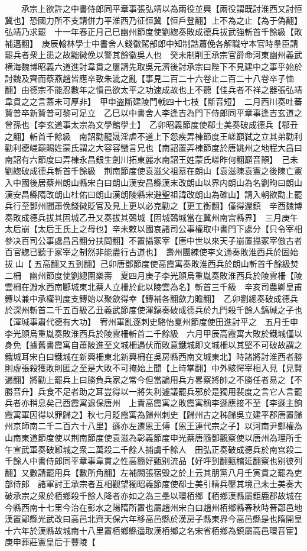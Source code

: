 　　承宗上欲許之中書侍郎同平章事張弘靖以為兩役並興【兩役謂既討淮西又討恒冀也】恐國力所不支請併力平淮西乃征恒冀【恒戶登翻】上不為之止【為于偽翻】弘靖乃求罷　十一年春正月己巳幽州節度使劉緫奏敗成德兵拔武強斬首千餘級【敗補邁翻】　庚辰翰林學士中書舍人錢徽駕部郎中知制誥蕭俛各解職守本官時羣臣請罷兵者衆上患之故黜徽俛以警其餘徽吳人也　癸未制削王承宗官爵命河東幽州義武横海魏博昭義六道進討韋貫之屢請先取吳元濟後討承宗曰陛下不見建中之事乎始於討魏及齊而蔡燕趙皆應卒致朱泚之亂【事見二百二十六卷止二百二十八卷卒子恤翻】由德宗不能忍數年之憤邑欲太平之功速成故也上不聽【佳兵者不祥之器張弘靖韋貫之之言蓋未可厚非】　甲申盗斷建陵門戟四十七枝【斷音短】　二月西川奏吐蕃贊普卒新贊普可黎可足立　乙巳以中書舍人李逢吉為門下侍郎同平章事逢吉玄道之曾孫也【李玄道事太宗為文學館學士】　乙卯昭義節度使郗士美奏破成德兵【郗丑之翻】斬首千餘級　南詔勸龍晟淫虐不道上下怨疾弄棟節度王嵯巔弑之立其弟勸利勸利德嵯巔賜姓蒙氏謂之大容容蠻言兄也【南詔置弄棟節度於唐姚州之地程大昌曰南詔有六節度曰弄棟永昌銀生劍川拓東麗水南詔王姓蒙氏嵯昨何翻巔音顛】　己未劉緫破成德兵斬首千餘級　荆南節度使袁滋父祖墓在朗山【袁滋陳袁憲之後陳亡憲入中國後居蔡州朗山縣宋白曰朗山漢安昌縣漢末改朗山以界内朗山為名劉昫曰朗山漢安昌縣隋改朗山杜佑曰朗山漢朗陵縣宋避聖祖諱改朗山為確山】請入朝欲勸上罷兵行至鄧州聞蕭俛錢徽貶官及見上更以必克勸之【更工衡翻】僅得還鎮　辛酉魏博奏敗成德兵拔其固城乙丑又奏拔其鵶城【固城鵶城當在冀州南宫縣界】　三月庚午太后崩【太后王氏上之母也】辛未敕以國哀諸司公事權取中書門下處分【只令宰相參决百司公事處昌呂翻分扶問翻】不置攝冢宰【唐中世以來天子崩置攝冢宰倣古者百官緫已聽于冢宰之制然非能盡行古道也】　壽州團練使李文通奏敗淮西兵於固始拔山【五高翻又五到翻】己卯唐鄧節度使高霞寓奏敗淮西兵於朗山斬首千餘級焚二柵　幽州節度使劉總圍樂壽　夏四月庚子李光顔烏重胤奏敗淮西兵於陵雲柵【陵雲柵在溵水西南郾城東北蔡人立柵於此以陵雲為名】斬首三千級　辛亥司農卿皇甫鏄以兼中承權判度支鏄始以聚歛得幸【鏄補各翻歛力贍翻】　乙卯劉總奏破成德兵於深州斬首二千五百級乙丑義武節度使渾鎬奏破成德兵於九門殺千餘人鎬瑊之子也【渾瑊事肅代德有大功】　宥州軍亂逐刺史駱怡夏州節度使田進討平之　五月壬申李光顔烏重胤奏敗淮西兵於陵雲柵斬首二千餘級　六月甲辰高霞寓大敗於鐵城僅以身免【據舊書霞寓自蕭陂進至文城柵遇伏而敗意鐵城即文城柵以其堅不可破故謂之鐵城耳宋白曰鐵城在新興柵東北新興柵在吳房縣西南文城東北】時諸將討淮西者勝則虛張殺獲敗則匿之至是大敗不可掩始上聞【上時掌翻】中外駭愕宰相入見【見賢遍翻】將勸上罷兵上曰勝負兵家之常今但當論用兵方畧察將帥之不勝任者易之【不勝音升】兵食不足者助之耳豈得以一將失利遽議罷兵邪於是獨用裴度之言它人言罷兵者亦稍息矣己酉霞寓退保唐州　上責高霞寓之敗霞寓稱李遜應接不至【李遜主餉霞寓軍因得以罪歸之】秋七月貶霞寓為歸州刺史【歸州古之秭歸吳立建平郡唐置歸州京師南二千二百六十八里】遜亦左遷恩王傅【恩王連代宗之子】以河南尹鄭權為山南東道節度使以荆南節度使袁滋為彰義節度申光蔡唐隨鄧觀察使以唐州為理所壬午宣武軍奏破郾城之衆二萬殺二千餘人捕虜千餘人　田弘正奏破成德兵於南宫殺二千餘人中書侍郎同平章事韋貫之性高簡好甄别流品【好呼到翻甄稽延翻察也别彼列翻】又數請罷用兵【數所角翻】左補闕張宿毁之於上云其朋黨八月壬寅貫之罷為吏部侍郎　諸軍討王承宗者互相觀望獨昭義節度使郗士美引精兵壓其境己未士美奏大破承宗之衆於栢鄉殺千餘人降者亦如之為三壘以環栢鄉【栢鄉漢縣屬鉅鹿郡故城在今縣西南十七里今治在彭水之陽隋所置也屬趙州宋白曰趙州栢鄉縣春秋時晉鄗邑地漢置鄗縣光武改曰高邑北齊天保六年移高邑縣於漢房子縣東界今高邑縣是也隋開皇十六年於漢縣故城南十八里置栢鄉縣遥取漢栢鄉之名宋省栢鄉為鎮屬高邑環音宦】　庚申葬莊憲皇后于豐陵【